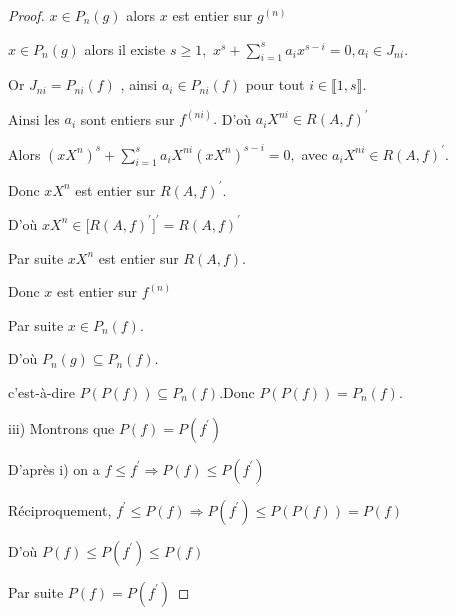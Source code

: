 \begin{proof}
	$x\in P_{n}(g)$ alors $x$ est entier sur $g^{(n)}$
	
	$x\in P_{n}(g)$ alors il existe $s\geq 1,$ $x^{s}+\sum\limits_{i=1}^{s}a_{i}x^{s-i}=0,a_{i}\in J_{ni}$.
	
	Or $J_{ni}=P_{ni}(f)$ , ainsi $a_{i}\in P_{ni}(f)$ pour tout $i\in \llbracket 1, s \rrbracket.$
	
	Ainsi les $a_{i}$ sont entiers sur $f^{(ni)}.$ D'où $a_{i}X^{ni}\in R(A,f)^{\prime }$
	
	Alors $(xX^{n})^{s}+\sum\limits_{i=1}^{s}a_{i}X^{ni}(xX^{n})^{s-i}=0,$ avec 
	$a_{i}X^{ni}\in R(A,f)^{\prime }$.
	
	Donc $xX^{n}$ est entier sur $R(A,f)^{\prime }$.
	
	D'où $xX^{n}\in \lbrack R(A,f)^{\prime }]^{\prime }=R(A,f)^{\prime }$
	
	Par suite $xX^{n}$ est entier sur $R(A,f)$.
	
	Donc $x$ est entier sur $f^{(n)}$
	
	Par suite $x\in P_{n}(f).$
	
	D'où $P_{n}(g)\subseteq P_{n}(f).$
	
	c'est-\`{a}-dire $P(P(f))\subseteq P_{n}(f).$Donc $P(P(f))=P_{n}(f).$
	
	
	
	iii) Montrons que $P(f)=P(f^{\prime })$
	
	D'après i) on a $f\leq f^{\prime }\Rightarrow P(f)\leq P(f^{\prime })$
	
	Réciproquement, $f^{\prime }\leq P(f)\Rightarrow P(f^{\prime })\leq
	P(P(f))=P(f)$
	
	D'où $P(f)\leq P(f^{\prime })\leq P(f)$
	
	Par suite $P(f)=P(f^{\prime })$
\end{proof}

